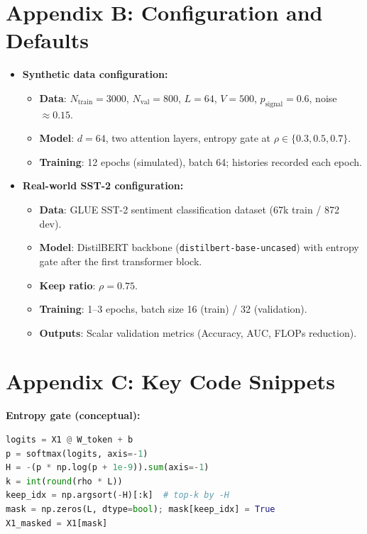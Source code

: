 \documentclass{article}
\newcommand{\Lseq}{L}
\newcommand{\dmodel}{d}
\begin{document}
\section*{Appendix B: Configuration and Defaults}
\begin{itemize}[leftmargin=1.2em, itemsep=2pt]
  \item \textbf{Synthetic data configuration:}
    \begin{itemize}[leftmargin=1.2em, itemsep=2pt]
      \item \textbf{Data}: $N_{\text{train}}{=}3000$, $N_{\text{val}}{=}800$, $\Lseq{=}64$, $V{=}500$, $p_{\text{signal}}{=}0.6$, noise $\approx 0.15$.
      \item \textbf{Model}: $\dmodel{=}64$, two attention layers, entropy gate at $\rho\in\{0.3,0.5,0.7\}$.
      \item \textbf{Training}: 12 epochs (simulated), batch 64; histories recorded each epoch.
    \end{itemize}

  \item \textbf{Real-world SST-2 configuration:}
    \begin{itemize}[leftmargin=1.2em, itemsep=2pt]
      \item \textbf{Data}: GLUE SST-2 sentiment classification dataset (67k train / 872 dev).
      \item \textbf{Model}: DistilBERT backbone (\texttt{distilbert-base-uncased}) with entropy gate after the first transformer block.
      \item \textbf{Keep ratio}: $\rho=0.75$.
      \item \textbf{Training}: 1--3 epochs, batch size 16 (train) / 32 (validation).
      \item \textbf{Outputs}: Scalar validation metrics (Accuracy, AUC, FLOPs reduction).
    \end{itemize}
\end{itemize}

\section*{Appendix C: Key Code Snippets}
\noindent\textbf{Entropy gate (conceptual):}
\begin{lstlisting}[language=Python,basicstyle=\ttfamily\small]
logits = X1 @ W_token + b
p = softmax(logits, axis=-1)
H = -(p * np.log(p + 1e-9)).sum(axis=-1)
k = int(round(rho * L))
keep_idx = np.argsort(-H)[:k]  # top-k by -H
mask = np.zeros(L, dtype=bool); mask[keep_idx] = True
X1_masked = X1[mask]
\end{lstlisting}
\end{document}
